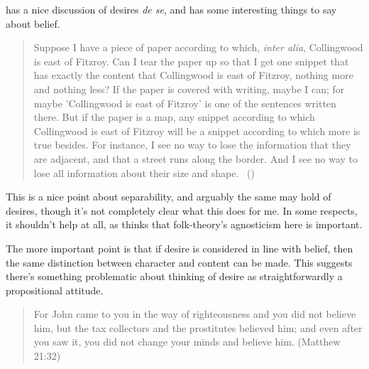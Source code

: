 \documentclass[10pt]{article}
\begin{document}
\textcite{Lewis:1979aa} has a nice discussion of desires \emph{de se}, and \textcite{Lewis:1999ab} has some interesting things to say about belief.
\begin{quote}
  Suppose I have a piece of paper according to which, \emph{inter alia}, Collingwood is east of Fitzroy.
  Can I tear the paper up so that I get one snippet that has exactly the content that Collingwood is east of Fitzroy, nothing more and nothing less?
  If the paper is covered with writing, maybe I can; for maybe 'Collingwood is east of Fitzroy' is one of the sentences written there.
  But if the paper is a map, any snippet according to which Collingwood is east of Fitzroy will be a snippet according to which more is true besides.
  For instance, I see no way to lose the information that they are adjacent, and that a street runs along the border.
  And I see no way to lose all information about their size and shape.\nolinebreak
  \mbox{ }\hfill(\citeyear[310]{Lewis:1999ab})
\end{quote}
This is a nice point about separability, and arguably the same may hold of desires, though it's not completely clear what this does for me.
In some respects, it shouldn't help at all, as \citeauthor{Lewis:1999ab} thinks that folk-theory's agnosticism here is important.

The more important point is that if desire is considered in line with belief, then the same distinction between character and content can be made.
This suggests there's something problematic about thinking of desire as straightforwardly a propositional attitude.



\begin{quote}
  For John came to you in the way of righteousness and you did not believe him, but the tax collectors and the prostitutes believed him; and even after you saw it, you did not change your minds and believe him.
  (Matthew 21:32)
\end{quote}
\end{document}
